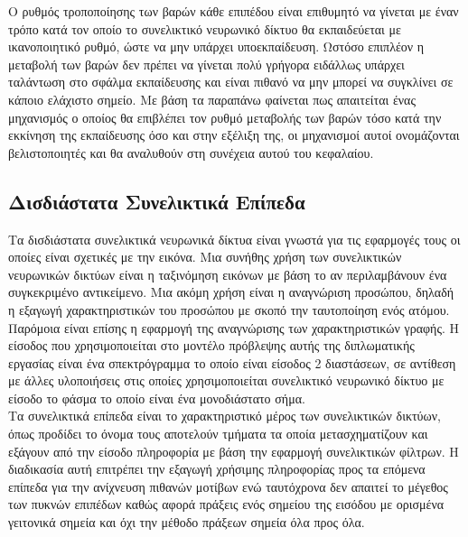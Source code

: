 Ο ρυθμός τροποποίησης των βαρών κάθε επιπέδου είναι επιθυμητό να γίνεται με έναν τρόπο κατά τον οποίο το συνελικτικό νευρωνικό δίκτυο θα εκπαιδεύεται με ικανοποιητικό ρυθμό, ώστε να μην υπάρχει υποεκπαίδευση. Ωστόσο επιπλέον η μεταβολή των βαρών δεν πρέπει να γίνεται πολύ γρήγορα ειδάλλως υπάρχει ταλάντωση στο σφάλμα εκπαίδευσης και είναι πιθανό να μην μπορεί να συγκλίνει σε κάποιο ελάχιστο σημείο. Με βάση τα παραπάνω φαίνεται πως απαιτείται ένας μηχανισμός ο οποίος θα επιβλέπει τον ρυθμό μεταβολής των βαρών τόσο κατά την εκκίνηση της εκπαίδευσης όσο και στην εξέλιξη της, οι μηχανισμοί αυτοί ονομάζονται βελιστοποιητές  και θα αναλυθούν στη συνέχεια αυτού του κεφαλαίου.

\subsection{Δισδιάστατα Συνελικτικά Επίπεδα}
Τα δισδιάστατα συνελικτικά νευρωνικά δίκτυα είναι γνωστά για τις εφαρμογές τους οι οποίες είναι σχετικές με την εικόνα. Μια συνήθης χρήση των συνελικτικών νευρωνικών δικτύων είναι η ταξινόμηση εικόνων με βάση το αν περιλαμβάνουν ένα συγκεκριμένο αντικείμενο. Μια ακόμη χρήση είναι η αναγνώριση προσώπου, δηλαδή η εξαγωγή χαρακτηριστικών του προσώπου με σκοπό την ταυτοποίηση ενός ατόμου. Παρόμοια είναι επίσης η εφαρμογή της αναγνώρισης των χαρακτηριστικών γραφής. 
Η είσοδος που χρησιμοποιείται στο μοντέλο πρόβλεψης αυτής της διπλωματικής εργασίας είναι ένα σπεκτρόγραμμα το οποίο είναι είσοδος 2 διαστάσεων, σε αντίθεση με άλλες υλοποιήσεις στις οποίες χρησιμοποιείται συνελικτικό νευρωνικό δίκτυο με είσοδο το φάσμα το οποίο είναι ένα μονοδιάστατο σήμα.\\

Τα συνελικτικά επίπεδα είναι το χαρακτηριστικό μέρος των συνελικτικών δικτύων, όπως προδίδει το όνομα τους αποτελούν τμήματα τα οποία μετασχηματίζουν και εξάγουν από την είσοδο πληροφορία με βάση την εφαρμογή συνελικτικών φίλτρων. Η διαδικασία αυτή επιτρέπει την εξαγωγή χρήσιμης πληροφορίας προς τα επόμενα επίπεδα για την ανίχνευση πιθανών μοτίβων ενώ ταυτόχρονα δεν απαιτεί το μέγεθος των πυκνών  επιπέδων καθώς αφορά πράξεις ενός σημείου της εισόδου με ορισμένα γειτονικά σημεία και όχι την μέθοδο πράξεων σημεία όλα προς όλα.

